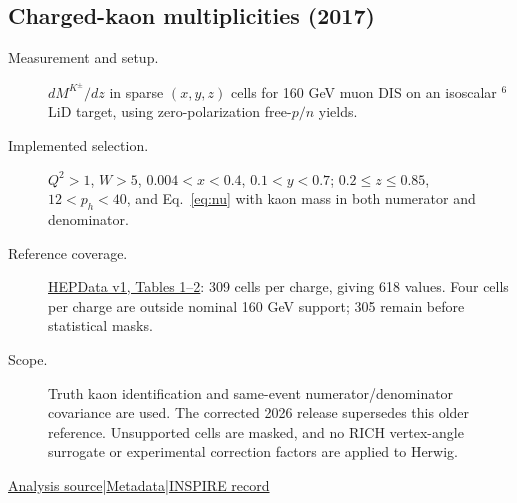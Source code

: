 \documentclass[11pt,a4paper]{article}
\newcommand{\id}[1]{{\small\texttt{\detokenize{#1}}}}
\begin{document}
\subsection{\texorpdfstring{Charged-kaon multiplicities (2017)}{Charged-kaon multiplicities (2017)}}
\id{COMPASS_2017_I1483098}\quad\cite{r1483098}
\begin{description}
\item[Measurement and setup.] $dM^{K^\pm}/dz$ in sparse $(x,y,z)$ cells for 160 GeV muon DIS on an isoscalar $^6$LiD target, using zero-polarization free-$p/n$ yields.
\item[Implemented selection.] $Q^2>1$, $W>5$, $0.004<x<0.4$, $0.1<y<0.7$; $0.2\le z\le0.85$, $12<p_h<40$, and Eq.~\eqref{eq:nu} with kaon mass in both numerator and denominator.
\item[Reference coverage.] \href{https://www.hepdata.net/record/ins1483098?version=1}{HEPData v1, Tables 1--2}: 309 cells per charge, giving 618 values. Four cells per charge are outside nominal 160 GeV support; 305 remain before statistical masks.
\item[Scope.] Truth kaon identification and same-event numerator/denominator covariance are used. The corrected 2026 release supersedes this older reference. Unsupported cells are masked, and no RICH vertex-angle surrogate or experimental correction factors are applied to Herwig.
\end{description}
{\small\href{https://github.com/apapaefs/HerwigPolarizedPheno/blob/105045bd757aaa6b217e87811dc5f9a22a8d1cef/analyses/rivet/dis/COMPASS_2017_I1483098.cc}{Analysis source}\quad|\quad\href{https://github.com/apapaefs/HerwigPolarizedPheno/blob/105045bd757aaa6b217e87811dc5f9a22a8d1cef/analyses/rivet/dis/COMPASS_2017_I1483098.info}{Metadata}\quad|\quad\href{https://inspirehep.net/literature/1483098}{INSPIRE record}}

\clearpage
{}
\end{document}
